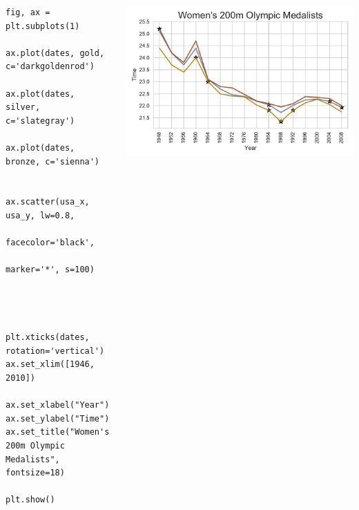 \documentclass{beamer}
\begin{document}
\begin{frame}[fragile]
\tiny{
\begin{columns}
\begin{column}{0.45\textwidth}
\begin{verbatim}
fig, ax = plt.subplots(1)

ax.plot(dates, gold, c='darkgoldenrod')

ax.plot(dates, silver, c='slategray')

ax.plot(dates, bronze, c='sienna')


ax.scatter(usa_x, usa_y, lw=0.8,
           facecolor='black',
           marker='*', s=100)




plt.xticks(dates, rotation='vertical')
ax.set_xlim([1946, 2010])

ax.set_xlabel("Year")
ax.set_ylabel("Time")
ax.set_title("Women's 200m Olympic Medalists", fontsize=18)

plt.show()
\end{verbatim}
\end{column}
\begin{column}{0.55\textwidth}
\includegraphics[width=\textwidth]{../olympics_5.pdf}
\end{column}
\end{columns}
}
\end{frame}
\end{document}

